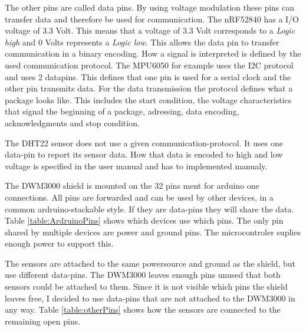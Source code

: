 The other pins are called data pins.
By using voltage modulation these pins can transfer data and therefore be used for communication.
The nRF52840 has a I/O voltage of 3.3 Volt.
This means that a voltage of 3.3 Volt corresponds to a \textit{Logic high} and 0 Volts represents a \textit{Logic low}.
This allows the data pin to transfer communication in a binary encoding.
How a signal is interpreted is defined by the used communication protocol.
The MPU6050 for example uses the I2C protocol and uses 2 datapins.
This defines that one pin is used for a serial clock and the other pin transmits data.
For the data transmission the protocol defines what a package looks like.
This includes the start condition, the voltage characteristics that signal the beginning of a package, adressing, data encoding, acknowledgments and stop condition.

The DHT22 sensor does not use a given communication-protocol.
It uses one data-pin to report its sensor data.
How that data is encoded to high and low voltage is specified in the user manual \cite{AM2302} and has to implemented manualy.

The DWM3000 shield is mounted on the 32 pins ment for arduino one connections. 
All pins are forwarded and can be used by other devices, in a common ardruino-stackable style.
If they are data-pins they will share the data.
Table \ref{table:ArdruinoPins} shows which devices use which pins.
The only pin shared by multiple devices are power and ground pins.
The microcontroler suplies enough power to support this.

The sensors are attached to the same powersource and ground as the shield, but use different data-pins.
The DWM3000 leaves enough pins unused that both sensors could be attached to them.
Since it is not visible which pins the shield leaves free, I decided to use data-pins that are not attached to the DWM3000 in any way.
Table \ref{table:otherPins} shows how the sensors are connected to the remaining open pins.

